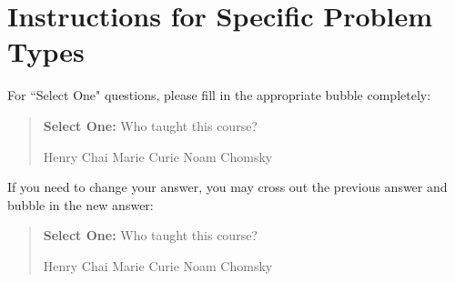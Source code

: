 \documentclass[11pt,addpoints,answers]{exam}
\newcommand{\blackcircle}{\tikz\draw[black,fill=black] (0,0) circle (1ex);}
\begin{document}



\section*{Instructions for Specific Problem Types}

For ``Select One" questions, please fill in the appropriate bubble completely:

\begin{quote}
\textbf{Select One:} Who taught this course?
    \begin{checkboxes}
     \CorrectChoice Henry Chai
     \choice Marie Curie
     \choice Noam Chomsky
    \end{checkboxes}
\end{quote}

If you need to change your answer, you may cross out the previous answer and bubble in the new answer:

\begin{quote}
\textbf{Select One:} Who taught this course?
    {
    \begin{checkboxes}
     \CorrectChoice Henry Chai
     \choice Marie Curie \checkboxchar{\xcancel{\blackcircle}{}}
     \choice Noam Chomsky
    \end{checkboxes}
    }
\end{quote}
\end{document}

